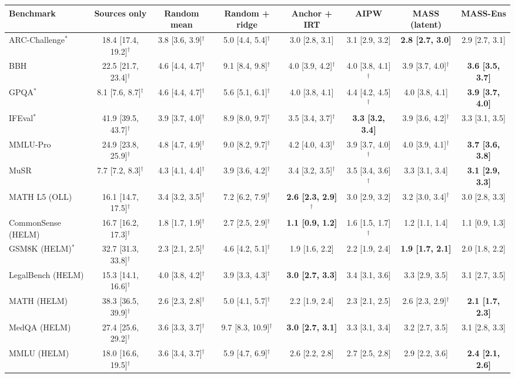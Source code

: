 \begin{tabular}{lccccccc}
\toprule
Benchmark & Sources only & Random mean & Random + ridge & Anchor + IRT & AIPW & MASS (latent) & MASS-Ens \\
\midrule
ARC-Challenge$^*$ & 18.4 [17.4, 19.2]$^\dagger$ & 3.8 [3.6, 3.9]$^\dagger$ & 5.0 [4.4, 5.4]$^\dagger$ & 3.0 [2.8, 3.1] & 3.1 [2.9, 3.2] & \textbf{2.8 [2.7, 3.0]} & 2.9 [2.7, 3.1] \\
BBH & 22.5 [21.7, 23.4]$^\dagger$ & 4.6 [4.4, 4.7]$^\dagger$ & 9.1 [8.4, 9.8]$^\dagger$ & 4.0 [3.9, 4.2]$^\dagger$ & 4.0 [3.8, 4.1]$^\dagger$ & 3.9 [3.7, 4.0]$^\dagger$ & \textbf{3.6 [3.5, 3.7]} \\
GPQA$^*$ & 8.1 [7.6, 8.7]$^\dagger$ & 4.6 [4.4, 4.7]$^\dagger$ & 5.6 [5.1, 6.1]$^\dagger$ & 4.0 [3.8, 4.1] & 4.4 [4.2, 4.5]$^\dagger$ & 4.0 [3.8, 4.1] & \textbf{3.9 [3.7, 4.0]} \\
IFEval$^*$ & 41.9 [39.5, 43.7]$^\dagger$ & 3.9 [3.7, 4.0]$^\dagger$ & 8.9 [8.0, 9.7]$^\dagger$ & 3.5 [3.4, 3.7]$^\dagger$ & \textbf{3.3 [3.2, 3.4]} & 3.9 [3.6, 4.2]$^\dagger$ & 3.3 [3.1, 3.5] \\
MMLU-Pro & 24.9 [23.8, 25.9]$^\dagger$ & 4.8 [4.7, 4.9]$^\dagger$ & 9.0 [8.2, 9.7]$^\dagger$ & 4.2 [4.0, 4.3]$^\dagger$ & 3.9 [3.7, 4.0]$^\dagger$ & 4.0 [3.9, 4.1]$^\dagger$ & \textbf{3.7 [3.6, 3.8]} \\
MuSR & 7.7 [7.2, 8.3]$^\dagger$ & 4.3 [4.1, 4.4]$^\dagger$ & 3.9 [3.6, 4.2]$^\dagger$ & 3.4 [3.2, 3.5]$^\dagger$ & 3.5 [3.4, 3.6]$^\dagger$ & 3.3 [3.1, 3.4] & \textbf{3.1 [2.9, 3.3]} \\
MATH L5 (OLL) & 16.1 [14.7, 17.5]$^\dagger$ & 3.4 [3.2, 3.5]$^\dagger$ & 7.2 [6.2, 7.9]$^\dagger$ & \textbf{2.6 [2.3, 2.9]$^\dagger$} & 3.0 [2.9, 3.2] & 3.2 [3.0, 3.4]$^\dagger$ & 3.0 [2.8, 3.3] \\
CommonSense (HELM) & 16.7 [16.2, 17.3]$^\dagger$ & 1.8 [1.7, 1.9]$^\dagger$ & 2.7 [2.5, 2.9]$^\dagger$ & \textbf{1.1 [0.9, 1.2]} & 1.6 [1.5, 1.7]$^\dagger$ & 1.2 [1.1, 1.4] & 1.1 [0.9, 1.3] \\
GSM8K (HELM)$^*$ & 32.7 [31.3, 33.8]$^\dagger$ & 2.3 [2.1, 2.5]$^\dagger$ & 4.6 [4.2, 5.1]$^\dagger$ & 1.9 [1.6, 2.2] & 2.2 [1.9, 2.4] & \textbf{1.9 [1.7, 2.1]} & 2.0 [1.8, 2.2] \\
LegalBench (HELM) & 15.3 [14.1, 16.6]$^\dagger$ & 4.0 [3.8, 4.2]$^\dagger$ & 3.9 [3.3, 4.3]$^\dagger$ & \textbf{3.0 [2.7, 3.3]} & 3.4 [3.1, 3.6] & 3.3 [2.9, 3.5] & 3.1 [2.7, 3.5] \\
MATH (HELM) & 38.3 [36.5, 39.9]$^\dagger$ & 2.6 [2.3, 2.8]$^\dagger$ & 5.0 [4.1, 5.7]$^\dagger$ & 2.2 [1.9, 2.4] & 2.3 [2.1, 2.5] & 2.6 [2.3, 2.9]$^\dagger$ & \textbf{2.1 [1.7, 2.3]} \\
MedQA (HELM) & 27.4 [25.6, 29.2]$^\dagger$ & 3.6 [3.3, 3.7]$^\dagger$ & 9.7 [8.3, 10.9]$^\dagger$ & \textbf{3.0 [2.7, 3.1]} & 3.3 [3.1, 3.4] & 3.2 [2.7, 3.5] & 3.1 [2.8, 3.3] \\
MMLU (HELM) & 18.0 [16.6, 19.5]$^\dagger$ & 3.6 [3.4, 3.7]$^\dagger$ & 5.9 [4.7, 6.9]$^\dagger$ & 2.6 [2.2, 2.8] & 2.7 [2.5, 2.8] & 2.9 [2.2, 3.6] & \textbf{2.4 [2.1, 2.6]} \\
\bottomrule
\end{tabular}
